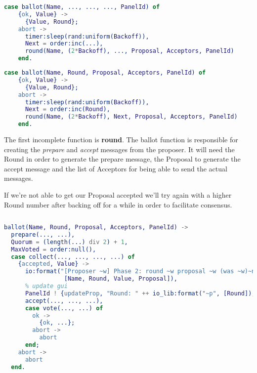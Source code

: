 \documentclass[a4paper, 10pt]{article}
\begin{document}
    \begin{minipage}{.45\textwidth}
	\begin{lstlisting}[language=erlang, caption={Template}]
	case ballot(Name, ..., ..., ..., PanelId) of  
	{ok, Value} ->
	  {Value, Round};
	abort ->
	  timer:sleep(rand:uniform(Backoff)),
	  Next = order:inc(...),
	  round(Name, (2*Backoff), ..., Proposal, Acceptors, PanelId)
	end.
	\end{lstlisting}
    \end{minipage}\hfill
    \begin{minipage}{.45\textwidth}
	\begin{lstlisting}[language=erlang, caption={Filled version}]
	case ballot(Name, Round, Proposal, Acceptors, PanelId) of
	{ok, Value} ->
	  {Value, Round};
	abort ->
	  timer:sleep(rand:uniform(Backoff)),
	  Next = order:inc(Round),
	  round(Name, (2*Backoff), Next, Proposal, Acceptors, PanelId)
	end.
	\end{lstlisting}
    \end{minipage}

    The first incomplete function is \textbf{round}. The ballot function is responsible for creating the \textit{prepare} and \textit{accept} messages from the proposer. It will need the Round in order to generate the prepare message, the Proposal to generate the accept message and the list of Acceptors for being able to send the actual messages.

    If we're not able to get our Proposal accepted we'll try again with a higher Round number after backing off for a while in order to facilitate consensus.
  

\begin{lstlisting}[language=erlang]
  
ballot(Name, Round, Proposal, Acceptors, PanelId) ->
  prepare(..., ...),
  Quorum = (length(...) div 2) + 1,
  MaxVoted = order:null(),
  case collect(..., ..., ..., ...) of
    {accepted, Value} ->
      io:format("[Proposer ~w] Phase 2: round ~w proposal ~w (was ~w)~n", 
                 [Name, Round, Value, Proposal]),
      % update gui
      PanelId ! {updateProp, "Round: " ++ io_lib:format("~p", [Round]), Value},
      accept(..., ..., ...),
      case vote(..., ...) of
        ok ->
          {ok, ...};
        abort ->
          abort
      end;
    abort ->
      abort
  end.
\end{lstlisting}
\end{document}
